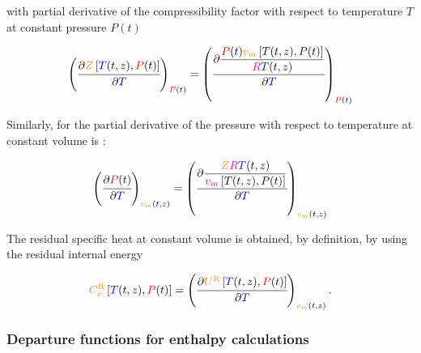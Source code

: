 \documentclass[../Article_Model_Parameters.tex]{subfiles}
\begin{document}
	with partial derivative of the compressibility factor with respect to temperature $T$ at constant pressure $P(t)$

	{\footnotesize
	\begin{equation}
		\left(\cfrac{\partial{\color{orange}Z}\left[{\color{blue}T}(t,z), {\color{red}P}(t)\right]}{\partial {\color{blue}T}}\right)_{{\color{red}P}(t)} = \left(\cfrac{\partial \dfrac{{\color{red}P}(t) {\color{orange}v_m}\left[T(t,z),P(t)\right]}{{\color{magenta}R}{\color{blue}T}(t,z)}}{\partial {\color{blue}T}}\right)_{{\color{red}P}(t)} \label{eq: dZdT}
	\end{equation} }

	Similarly, for the partial derivative of the pressure with respect to temperature at constant volume is :
	
	{\footnotesize
	\begin{equation}
		\left(\cfrac{\partial {\color{red}P}(t)}{\partial {\color{blue}T}}\right)_{{\color{orange}v_m}(t,z)} = \left( \cfrac{\partial{\dfrac{{\color{orange}Z}{\color{magenta}R}{\color{blue}T}(t,z)}{{\color{magenta}v_m}\left[T(t,z),P(t)\right]}}}{\partial{\color{blue}T}}\right)_{{\color{orange}v_m}(t,z)} \label{eq: dPdT}
	\end{equation} }
	
	The residual specific heat at constant volume is obtained, by definition, by using the residual internal energy
	
	{\footnotesize
	\begin{equation}
		{\color{orange}C_v^{\text{R}}}\left[{\color{blue}T}(t,z),{\color{red}P}(t)\right] = \left(\cfrac{\partial{\color{orange}U^{\text{R}}}\left[{\color{blue}T}(t,z),{\color{red}P}(t)\right]}{\partial {\color{blue}T}}\right)_{{\color{orange}v_m}(t,z)}. \label{eq: CvR}
	\end{equation} }
	
	
	\subsubsection{Departure functions for enthalpy calculations} \label{CH:Enthalpy}
	
\end{document}

